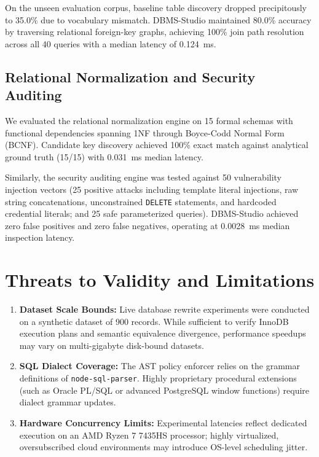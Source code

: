 \documentclass[conference]{IEEEtran}
\begin{document}
On the unseen evaluation corpus, baseline table discovery dropped precipitously to 35.0\% due to vocabulary mismatch. DBMS-Studio maintained 80.0\% accuracy by traversing relational foreign-key graphs, achieving 100\% join path resolution across all 40 queries with a median latency of 0.124~ms.

\subsection{Relational Normalization and Security Auditing}
We evaluated the relational normalization engine on 15 formal schemas with functional dependencies spanning 1NF through Boyce-Codd Normal Form (BCNF). Candidate key discovery achieved 100\% exact match against analytical ground truth (15/15) with 0.031~ms median latency. 

Similarly, the security auditing engine was tested against 50 vulnerability injection vectors (25 positive attacks including template literal injections, raw string concatenations, unconstrained \texttt{DELETE} statements, and hardcoded credential literals; and 25 safe parameterized queries). DBMS-Studio achieved zero false positives and zero false negatives, operating at 0.0028~ms median inspection latency.

\section{Threats to Validity and Limitations}

\begin{enumerate}
    \item \textbf{Dataset Scale Bounds:} Live database rewrite experiments were conducted on a synthetic dataset of 900 records. While sufficient to verify InnoDB execution plans and semantic equivalence divergence, performance speedups may vary on multi-gigabyte disk-bound datasets.
    \item \textbf{SQL Dialect Coverage:} The AST policy enforcer relies on the grammar definitions of \texttt{node-sql-parser}. Highly proprietary procedural extensions (such as Oracle PL/SQL or advanced PostgreSQL window functions) require dialect grammar updates.
    \item \textbf{Hardware Concurrency Limits:} Experimental latencies reflect dedicated execution on an AMD Ryzen 7 7435HS processor; highly virtualized, oversubscribed cloud environments may introduce OS-level scheduling jitter.
\end{enumerate}
\end{document}
